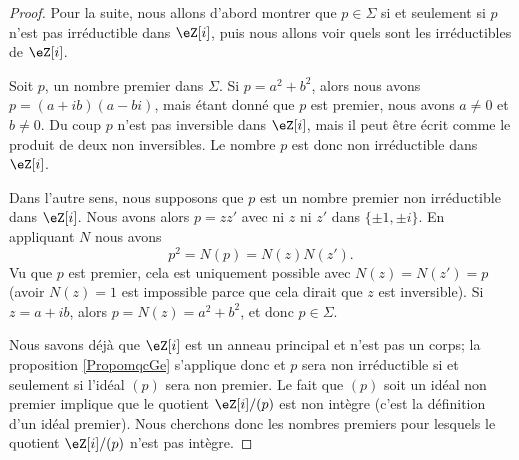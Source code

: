\begin{proof}
   

    Pour la suite, nous allons d'abord montrer que \( p\in\Sigma\) si et seulement si \( p\) n'est pas irréductible dans \( \eZ[i]\), puis nous allons voir quels sont les irréductibles de \( \eZ[i]\).

    Soit \( p\), un nombre premier dans \( \Sigma\). Si \( p=a^2+b^2\), alors nous avons \( p=(a+ib)(a-bi)\), mais étant donné que \( p\) est premier, nous avons \( a\neq 0\) et \( b\neq 0\). Du coup \( p\) n'est pas inversible dans \( \eZ[i]\), mais il peut être écrit comme le produit de deux non inversibles. Le nombre \( p\) est donc non irréductible dans \( \eZ[i]\).

    Dans l'autre sens, nous supposons que \( p\) est un nombre premier non irréductible dans \( \eZ[i]\). Nous avons alors \( p=zz'\) avec ni \( z\) ni \( z'\) dans \( \{ \pm 1,\pm i \}\). En appliquant \( N\) nous avons
    \begin{equation}
        p^2=N(p)=N(z)N(z').
    \end{equation}
    Vu que \( p\) est premier, cela est uniquement possible avec \( N(z)=N(z')=p\) (avoir \( N(z)=1\) est impossible parce que cela dirait que \( z\) est inversible). Si \( z=a+ib\), alors \( p=N(z)=a^2+b^2\), et donc \( p\in \Sigma\).

    Nous savons déjà que \( \eZ[i]\) est un anneau principal et n'est pas un corps; la proposition \ref{PropomqcGe} s'applique donc et \( p\) sera non irréductible si et seulement si l'idéal \( (p)\) sera non premier. Le fait que \( (p)\) soit un idéal non premier implique que le quotient \( \eZ[i]/(p)\) est non intègre (c'est la définition d'un idéal premier). Nous cherchons donc les nombres premiers pour lesquels le quotient \( \eZ[i]/(p)\) n'est pas intègre.


\end{proof}
